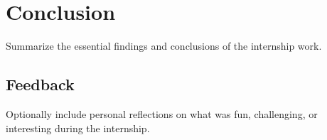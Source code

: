 \section{Conclusion}
Summarize the essential findings and conclusions of the internship work.



\subsection{Feedback}
Optionally include personal reflections on what was fun, challenging, or
interesting during the internship.